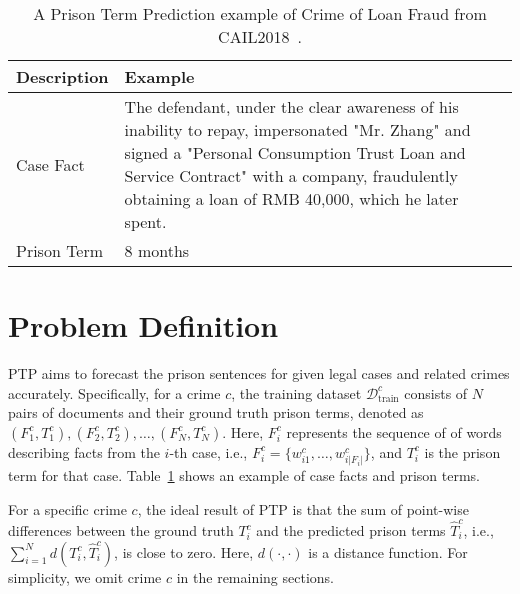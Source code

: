 \begin{table}[]
    \centering
    \small
    \begin{tabular}{p{}p{}}
    \toprule
       Description  &  Example\\
       \hline
       Case Fact  &  The defendant, under the clear awareness of his inability to repay, impersonated "Mr. Zhang" and signed a "Personal Consumption Trust Loan and Service Contract" with a company, fraudulently obtaining a loan of RMB 40,000, which he later spent.\\
       Prison Term & 8 months\\
       \bottomrule
    \end{tabular}
    \caption{A Prison Term Prediction example of Crime of Loan Fraud from CAIL2018~\cite{DBLP:journals/corr/abs-1807-02478}.}
    \label{tab: case example}
    \vspace{-2em}
\end{table}

\section{Problem Definition}

PTP aims to forecast the prison sentences for given legal cases and related crimes accurately. Specifically, for a crime $c$, the training dataset $\mathcal{D}_{\text{train}}^{c}$ consists of $N$ pairs of documents and their ground truth prison terms, denoted as ${(F_1^{c}, T_1^{c}),(F_2^{c}, T_2^{c}), \ldots, (F_N^{c}, T_N^{c})}$. Here, $F_i^{c}$ represents the sequence of of words describing facts from the $i$-th case, i.e., $F_i^{c}=\{w_{i1}^{c},\ldots,w_{i|F_i|}^{c}\}$, and $T_i^{c}$ is the prison term for that case. Table~\ref{tab: case example} shows an example of case facts and prison terms.

For a specific crime $c$, the ideal result of PTP is that 
the sum of point-wise differences between the ground truth ${T}_i^{c}$ and the predicted prison terms $\hat{T}_i^{c}$, i.e., $\sum_{i=1}^N d({T}_i^{c}, \hat{T}_i^{c})$, is close to zero. Here, $d(\cdot,\cdot)$ is a distance function. For simplicity, we omit crime $c$ in the remaining sections.

